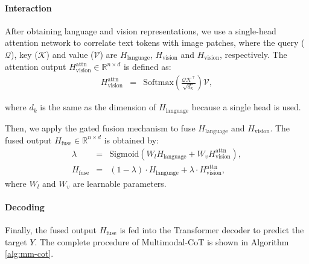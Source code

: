 \documentclass[nohyperref]{article}
\theoremstyle{plain}
\theoremstyle{definition}
\theoremstyle{remark}
\begin{document}
\paragraph{Interaction} After obtaining language and vision representations, we use a single-head attention network to correlate text tokens with image patches, where the query ($\mathcal{Q}$), key ($\mathcal{K}$) and value ($\mathcal{V}$) are $H_{\textrm{language}}$, $H_{\textrm{vision}}$ and $H_{\textrm{vision}}$, respectively. The attention output $H_{\textrm{vision}}^\textrm{attn} \in \mathbb{R}^{n \times d}$ is defined as:
\begin{eqnarray}
	H_{\textrm{vision}}^\textrm{attn} & = & \textrm{Softmax}(\frac{\mathcal{Q}{\mathcal{K}^{\top}}}{\sqrt{d_k}})\mathcal{V},
	  \label{eq:selective_attn}
\end{eqnarray}

\noindent where $d_k$ is the same as the dimension of $H_{\textrm{language}}$ because a single head is used. 

Then, we apply the gated fusion mechanism \citep{zhang2020neural,wu2021good,li2022vision} to fuse $H_{\textrm{language}}$ and $H_{\textrm{vision}}$. The fused output $H_{\textrm{fuse}} \in \mathbb{R}^{n \times d}$ is obtained by:
\begin{eqnarray}
	\lambda & = & \textrm{Sigmoid}(W_{l}{H_{\textrm{language}}} + W_{v}{H_{\textrm{vision}}^\textrm{attn}}), \label{eq:gate}\\
	H_{\textrm{fuse}} & = & (1 - \lambda) \cdot H_{\textrm{language}} + \lambda \cdot H_{\textrm{vision}}^\textrm{attn} ,\label{eq:gated_fusion}
\end{eqnarray}
\noindent where $W_{l}$ and $W_{v}$ are learnable parameters. 


\paragraph{Decoding} Finally, the fused output $H_{\textrm{fuse}}$ is fed into the  Transformer decoder to predict the target $Y$. The complete procedure of Multimodal-CoT is shown in Algorithm \ref{alg:mm-cot}.
\end{document}

